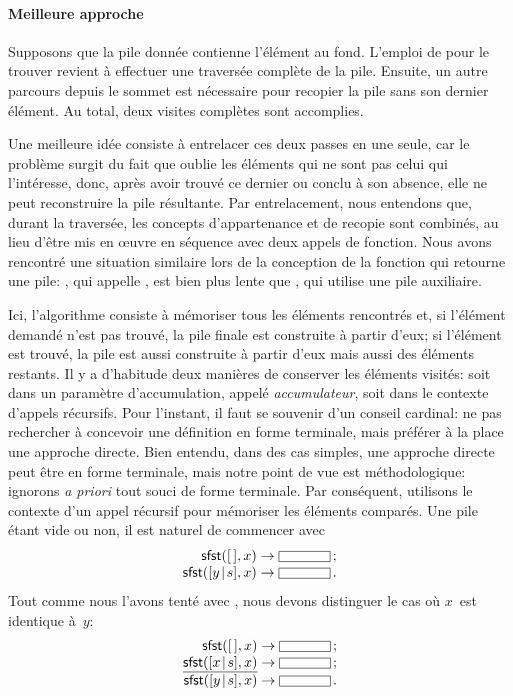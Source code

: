 \paragraph{Meilleure approche}

Supposons que la pile donnée contienne l'élément au fond. L'emploi de
 pour le trouver revient à effectuer une traversée complète
de la pile. Ensuite, un autre parcours depuis le sommet est nécessaire
pour recopier la pile sans son dernier élément. Au total, deux visites
complètes sont accomplies.

Une meilleure idée consiste à entrelacer ces deux passes en une seule,
car le problème surgit du fait que  oublie les éléments qui
ne sont pas celui qui l'intéresse, donc, après avoir trouvé ce dernier
ou conclu à son absence, elle ne peut reconstruire la pile
résultante. Par entrelacement, nous entendons que, durant la
traversée, les concepts d'appartenance et de recopie sont combinés, au
lieu d'être mis en {\oe}uvre en séquence avec deux appels de
fonction. Nous avons rencontré une situation similaire lors de la
conception de la fonction qui retourne une pile: , qui
appelle , est bien plus lente que , qui utilise
une pile auxiliaire.

Ici, l'algorithme consiste à mémoriser tous les éléments rencontrés
et, si l'élément demandé n'est pas trouvé, la pile finale est
construite à partir d'eux; si l'élément est trouvé, la pile est aussi
construite à partir d'eux mais aussi des éléments restants. Il y a
d'habitude deux manières de conserver les éléments visités: soit dans
un paramètre d'accumulation, appelé \emph{accumulateur}, soit dans le
contexte d'appels récursifs. Pour l'instant, il faut se souvenir d'un
conseil cardinal: ne pas rechercher à concevoir une définition en
forme terminale, mais préférer à la place une approche directe. Bien
entendu, dans des cas simples, une approche directe peut être en forme
terminale, mais notre point de vue est méthodologique: ignorons
\emph{a priori} tout souci de forme terminale. Par conséquent,
utilisons le contexte d'un appel récursif pour mémoriser les éléments
comparés. Une pile étant vide ou non, il est naturel de commencer avec
\begin{equation*}
\begin{array}{r@{\;}l@{\;}l}
\fun{sfst}(\el,x) & \rightarrow & \fbcode{CCCCC}\,;\\
\fun{sfst}(\cons{y}{s},x) & \rightarrow & \fbcode{CCCCC}\,.
\end{array}
\end{equation*}
Tout comme nous l'avons tenté avec , nous devons distinguer
le cas où \(x\)~est identique à~\(y\):
\begin{equation*}
\begin{array}{r@{\;}l@{\;}l}
\fun{sfst}(\el,x) & \rightarrow & \fbcode{CCCCC}\,;\\
\underline{\fun{sfst}(\cons{x}{s},x)} & \rightarrow & \fbcode{CCCCC}\,;\\
\fun{sfst}(\cons{y}{s},x) & \rightarrow & \fbcode{CCCCC}\,.
\end{array}
\end{equation*}

